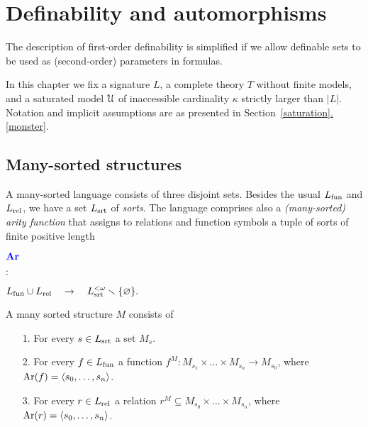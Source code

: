 \documentclass[creche.tex]{subfiles}
\begin{document}
\chapter{Definability and automorphisms}
\label{imaginary}

\def\ceq#1#2#3{\parbox{15ex}{$\displaystyle #1$}\parbox{6ex}{\hfil$\displaystyle #2$}$\displaystyle  #3$}

\def\medrel#1{\parbox[t]{6ex}{$\displaystyle\hfil #1$}}
\def\ceq#1#2#3{\parbox[t]{25ex}{$\displaystyle #1$}\medrel{#2}{$\displaystyle #3$}}


\def\b{b\llap{\raisebox{-.8ex}{-\hskip.2ex}}}
\def\a{a\llap{\raisebox{-.8ex}{-\hskip.2ex}}}
\def\d{{\rm def}}

The description of first-order definability is simplified if we allow definable sets to be used as (second-order) parameters in formulas.

In this chapter we fix a signature $L$, a complete theory $T$ without finite models, and a saturated model $\EuScript U$ of inaccessible cardinality $\kappa$ strictly larger than $|L|$. Notation and implicit assumptions are as presented in Section~\hyperref[saturation]{\ref*{saturation}.\ref*{monster}}.

\section{Many-sorted structures}
\label{many-sorted}
\def\Ar{{\rm Ar}}

A many-sorted language consists of three disjoint sets. Besides the usual $L_{\rm fun}$ and $L_{\rm rel}$, we have a set $L_{\rm srt}$ of \emph{sorts}. The language comprises also a \emph{(many-sorted) arity function} that assigns to relations and function symbols a tuple of sorts of finite positive length

\ceq{\hfill\emph{Ar}}{:}{L_{\rm fun}\cup L_{\rm rel}\quad \to\quad L_{\rm srt}^{<\omega}\sm\{\0\}.}

A many sorted structure $M$ consists of
\begin{itemize}
\item[1.] For every $s\in L_{\rm srt}$ a set $M_s$.
\item[2.] For every $f\in L_{\rm fun}$ a function $f^M:M_{s_1}\times\dots\times M_{s_n}\to M_{s_0}$, where $\Ar(f)=\<s_0,\dots,s_n\>$.
\item[3.] For every $r\in L_{\rm rel}$ a relation $r^M\subseteq M_{s_0}\times\dots\times M_{s_n}$, where $\Ar(r)=\<s_0,\dots,s_n\>$.
\end{itemize}
\end{document}
